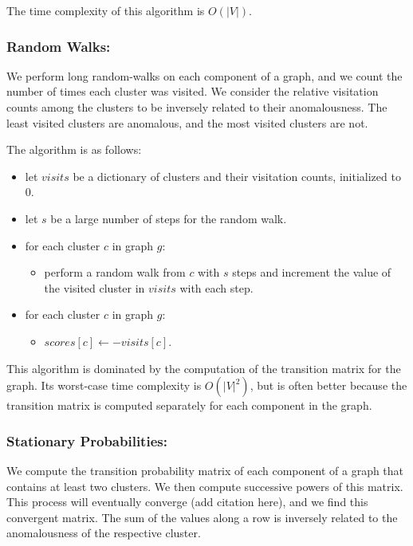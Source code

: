 The time complexity of this algorithm is $O(|V|)$.


\subsubsection{Random Walks:}
We perform long random-walks on each component of a graph, and we count the number of times each cluster was visited.
We consider the relative visitation counts among the clusters to be inversely related to their anomalousness.
The least visited clusters are anomalous, and the most visited clusters are not.

The algorithm is as follows:

\begin{itemize}
    \item let $visits$ be a dictionary of clusters and their visitation counts, initialized to $0$.
    \item let $s$ be a large number of steps for the random walk.
    \item for each cluster $c$ in graph $g$:
    \begin{itemize}
        \item perform a random walk from $c$ with $s$ steps and increment the value of the visited cluster in $visits$ with each step.
    \end{itemize}
    \item for each cluster $c$ in graph $g$:
    \begin{itemize}
        \item $scores[c] \leftarrow -visits[c]$.
    \end{itemize}
\end{itemize}

This algorithm is dominated by the computation of the transition matrix for the graph.
Its worst-case time complexity is $O(|V|^2)$, but is often better because the transition matrix is computed separately for each component in the graph.

\subsubsection{Stationary Probabilities:}
We compute the transition probability matrix of each component of a graph that contains at least two clusters.
We then compute successive powers of this matrix.
This process will eventually converge (add citation here), and we find this convergent matrix.
The sum of the values along a row is inversely related to the anomalousness of the respective cluster.

